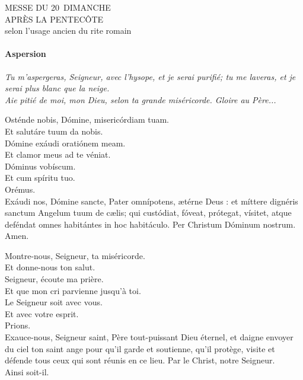 \documentclass[twoside]{article}
\begin{document}
\null \newpage

\sloppy

\begin{center}\begin{doublespace}
{
\MakeUppercase{\Large Messe du 20\ieme~dimanche \\ après la Pentecôte}\\
selon l'usage ancien du rite romain
}
\end{doublespace}\end{center}

\paragraph{Aspersion}


\emph{\rr Tu m'aspergeras, Seigneur, avec l'hysope, et je serai purifié; tu me laveras, et je serai plus blanc que la neige.\\
\vv Aie pitié de moi, mon Dieu, selon ta grande miséricorde. Gloire au Père...}

\begin{paracol}{2}
\vv Osténde nobis, Dómine, misericórdiam tuam.\\
\rr Et salutáre tuum da nobis.\\
\vv Dómine exáudi oratiónem meam.\\
\rr Et clamor meus ad te véniat.\\
\vv Dóminus vobíscum.\\
\rr Et cum spíritu tuo.\\
\vv Orémus.\\
Exáudi nos, Dómine sancte, Pater omnípotens, ætérne Deus :
et míttere dignéris sanctum Angelum tuum de cælis; qui custódiat,
fóveat, prótegat, vísitet, atque deféndat omnes habitántes in hoc habitáculo.
Per Christum Dóminum nostrum.\\
\rr Amen.

\switchcolumn

\vv Montre-nous, Seigneur, ta miséricorde.\\
\rr Et donne-nous ton salut.\\
\vv Seigneur, écoute ma prière.\\
\rr Et que mon cri parvienne jusqu’à toi.\\
\vv Le Seigneur soit avec vous.\\
\rr Et avec votre esprit.\\
\vv Prions. \\
Exauce-nous, Seigneur saint, Père tout-puissant Dieu éternel,
et daigne envoyer du ciel ton saint ange pour qu’il garde et soutienne,
qu’il protège, visite et défende tous ceux qui sont réunis en ce lieu.
Par le Christ, notre Seigneur.\\
\rr Ainsi soit-il.

\end{paracol}
\end{document}
